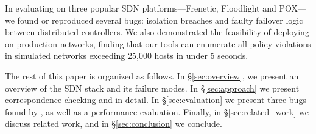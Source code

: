 In evaluating \projectname{} on
three popular SDN platforms---Frenetic, Floodlight and POX---we found or reproduced several bugs:
isolation breaches and faulty failover logic between distributed controllers.
We also demonstrated the feasibility of deploying
\projectname{} on production networks,
finding that our tools can enumerate all policy-violations in
simulated networks exceeding 25,000 hosts in under 5 seconds.

The rest of this paper is organized as follows. In \S\ref{sec:overview},
we present an overview of the SDN stack and its failure modes.
In \S\ref{sec:approach} we present correspondence checking and
\simulator{} in detail. In \S\ref{sec:evaluation} we present
three bugs found by \projectname{}, as well as a performance evaluation.
Finally, in \S\ref{sec:related_work} we discuss related work,
and in \S\ref{sec:conclusion} we conclude.


